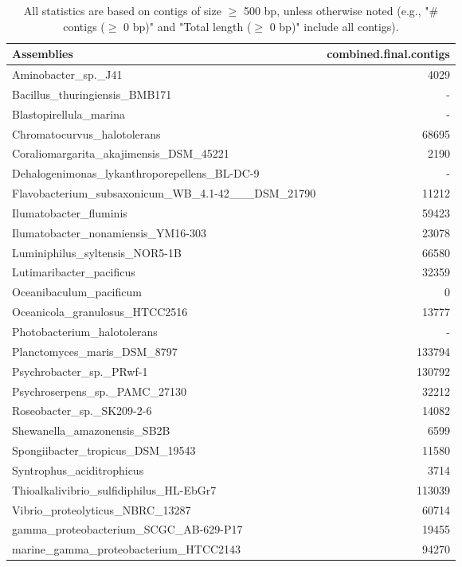 \documentclass[12pt,a4paper]{article}
\begin{document}
\begin{table}[ht]
\begin{center}
\caption{All statistics are based on contigs of size $\geq$ 500 bp, unless otherwise noted (e.g., "\# contigs ($\geq$ 0 bp)" and "Total length ($\geq$ 0 bp)" include all contigs).}
\begin{tabular}{|l*{1}{|r}|}
\hline
Assemblies & combined.final.contigs \\ \hline
Aminobacter\_sp.\_J41 & 4029 \\ \hline
Bacillus\_thuringiensis\_BMB171 & - \\ \hline
Blastopirellula\_marina & - \\ \hline
Chromatocurvus\_halotolerans & 68695 \\ \hline
Coraliomargarita\_akajimensis\_DSM\_45221 & 2190 \\ \hline
Dehalogenimonas\_lykanthroporepellens\_BL-DC-9 & - \\ \hline
Flavobacterium\_subsaxonicum\_WB\_4.1-42\_\_\_DSM\_21790 & 11212 \\ \hline
Ilumatobacter\_fluminis & 59423 \\ \hline
Ilumatobacter\_nonamiensis\_YM16-303 & 23078 \\ \hline
Luminiphilus\_syltensis\_NOR5-1B & 66580 \\ \hline
Lutimaribacter\_pacificus & 32359 \\ \hline
Oceanibaculum\_pacificum & 0 \\ \hline
Oceanicola\_granulosus\_HTCC2516 & 13777 \\ \hline
Photobacterium\_halotolerans & - \\ \hline
Planctomyces\_maris\_DSM\_8797 & 133794 \\ \hline
Psychrobacter\_sp.\_PRwf-1 & 130792 \\ \hline
Psychroserpens\_sp.\_PAMC\_27130 & 32212 \\ \hline
Roseobacter\_sp.\_SK209-2-6 & 14082 \\ \hline
Shewanella\_amazonensis\_SB2B & 6599 \\ \hline
Spongiibacter\_tropicus\_DSM\_19543 & 11580 \\ \hline
Syntrophus\_aciditrophicus & 3714 \\ \hline
Thioalkalivibrio\_sulfidiphilus\_HL-EbGr7 & 113039 \\ \hline
Vibrio\_proteolyticus\_NBRC\_13287 & 60714 \\ \hline
gamma\_proteobacterium\_SCGC\_AB-629-P17 & 19455 \\ \hline
marine\_gamma\_proteobacterium\_HTCC2143 & 94270 \\ \hline
\end{tabular}
\end{center}
\end{table}
\end{document}
